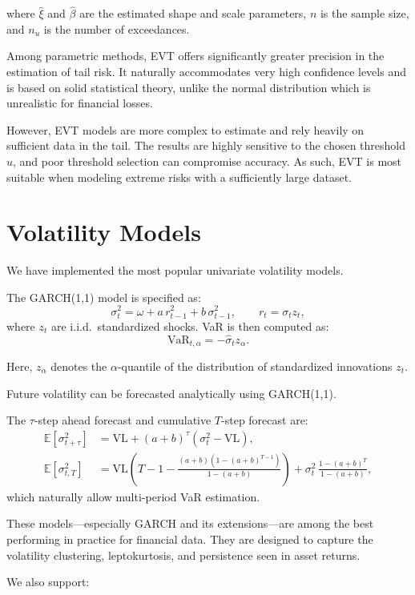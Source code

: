 \documentclass[12pt]{article}
\begin{document}
where $\hat{\xi}$ and $\hat{\beta}$ are the estimated shape and scale parameters, $n$ is the sample size, and $n_u$ is the number of exceedances.

Among parametric methods, EVT offers significantly greater precision in the estimation of tail risk. It naturally accommodates very high confidence levels and is based on solid statistical theory, unlike the normal distribution which is unrealistic for financial losses.

However, EVT models are more complex to estimate and rely heavily on sufficient data in the tail. The results are highly sensitive to the chosen threshold $u$, and poor threshold selection can compromise accuracy. As such, EVT is most suitable when modeling extreme risks with a sufficiently large dataset.


\section{Volatility Models}

We have implemented the most popular univariate volatility models.

The GARCH(1,1) model is specified as:
\[
  \sigma_t^2 = \omega + a\, r_{t-1}^2 + b\, \sigma_{t-1}^2, \qquad r_t = \sigma_t z_t,
\]
where \( z_t \) are i.i.d.\ standardized shocks. VaR is then computed as:
\[
  \text{VaR}_{t,\alpha} = -\hat{\sigma}_t z_\alpha.
\]

Here, \( z_\alpha \) denotes the \( \alpha \)-quantile of the distribution of standardized innovations \( z_t \).

Future volatility can be forecasted analytically using GARCH(1,1).

The \( \tau \)-step ahead forecast and cumulative \( T \)-step forecast are:
\begin{align*}
  \mathbb{E}[\sigma_{t+\tau}^2] &= \mathrm{VL} + (a + b)^\tau(\sigma_t^2 - \mathrm{VL}),  \\  
  \mathbb{E}[\sigma_{t,T}^2] &= \mathrm{VL}\left(T - 1 - \frac{(a + b)(1 - (a + b)^{T - 1})}{1 - (a + b)}\right)
    + \sigma_t^2\, \frac{1 - (a + b)^T}{1 - (a + b)},
\end{align*}
which naturally allow multi-period VaR estimation.

These models—especially GARCH and its extensions—are among the best performing in practice for financial data. They are designed to capture the volatility clustering, leptokurtosis, and persistence seen in asset returns.


We also support:
\end{document}
